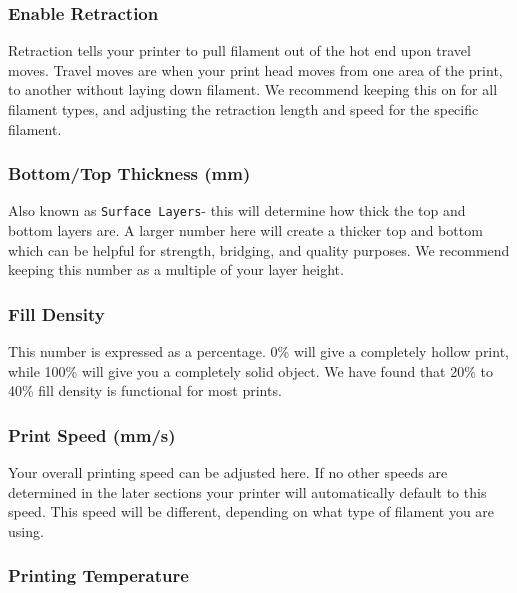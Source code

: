 \subsubsection{Enable Retraction}
Retraction tells your printer to pull filament out of the hot end upon travel moves. Travel moves are when your print head moves from one area of the print, to another without laying down filament. We recommend keeping this on for all filament types, and adjusting the retraction length and speed for the specific filament.

\subsubsection{Bottom/Top Thickness (mm)}
Also known as \texttt{Surface Layers}- this will determine how thick the top and bottom layers are. A larger number here will create a thicker top and bottom which can be helpful for strength, bridging, and quality purposes. We recommend keeping this number as a multiple of your layer height.

\subsubsection{Fill Density}
This number is expressed as a percentage. 0\% will give a completely hollow print, while 100\% will give you a completely solid object. We have found that 20\% to 40\% fill density is functional for most prints.

\subsubsection{Print Speed (mm/s)}
Your overall printing speed can be adjusted here. If no other speeds are determined in the later sections your printer will automatically default to this speed. This speed will be different, depending on what type of filament you are using.

\subsubsection{Printing Temperature}

